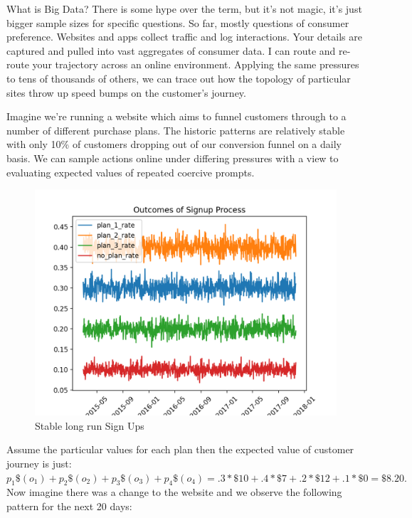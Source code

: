 \documentclass[10pt,a4paper,notitlepage, twocolumn]{article}
\begin{document}
\noindent What is Big Data? There is some hype over the term, but it's not magic, it's just bigger sample sizes for specific questions. So far, mostly questions of consumer preference. Websites and apps collect traffic and log interactions. Your details are captured and pulled into vast aggregates of consumer data. I can route and re-route your trajectory across an online environment. Applying the same pressures to tens of thousands of others, we can trace out how the topology of particular sites throw up speed bumps on the customer's journey. 

Imagine we're running a website which aims to funnel customers through to a number of different purchase plans. The historic patterns are relatively stable with only 10\% of customers dropping out of our conversion funnel on a daily basis. We can sample actions online under differing pressures with a view to evaluating expected values of repeated coercive prompts.

\begin{figure}[H]
  \includegraphics[width=\linewidth]{./Plots/outcomes_of_signup.png}
  \caption{Stable long run Sign Ups }
\end{figure}

Assume the particular values for each plan then the expected value of customer journey is just: $ p_{1}\$(o_{1}) + p_{2}\$(o_{2}) + p_{3}\$(o_{3}) + p_{4}\$(o_{4})  = .3*\$10 + .4*\$7  + .2*\$12 + .1*\$0 = \$8.20.$ Now imagine there was a change to the website and we observe the following pattern for the next 20 days:
\end{document}
